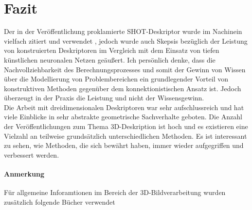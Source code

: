 \documentclass[12pt]{article}
\begin{document}
\section{Fazit}
Der in der Veröffentlichung proklamierte SHOT-Deskriptor wurde im Nachinein vielfach zitiert und verwendet \cite{c1,c2,c3}, jedoch wurde auch Skepsis bezüglich der Leistung von konstruierten Deskriptoren im Vergleich mit dem Einsatz von tiefen künstlichen neuronalen Netzen geäußert.
Ich persönlich denke, dass die Nachvollziehbarkeit des Berechnungsprozesses und somit der Gewinn von Wissen über die Modellierung von Problembereichen ein grundlegender Vorteil von konstruktiven Methoden gegenüber dem konnektionistischen Ansatz ist. Jedoch überzeugt in der Praxis die Leistung und nicht der Wissensgewinn.\\

Die Arbeit mit dreidimensionalen Deskriptoren  war sehr aufschlussreich und hat viele Einblicke in sehr abstrakte geometrische Sachverhalte geboten. Die Anzahl der Veröffentlichungen zum Thema 3D-Deskription ist hoch und es existieren eine Vielzahl an teilweise grundsätzlich unterschiedlichen Methoden. Es ist interessant zu sehen, wie Methoden, die sich bewährt haben, immer wieder aufgegriffen und verbessert werden.


\paragraph{Anmerkung}
Für allgemeine Inforamtionen im Bereich der 3D-Bildverarbeitung wurden zusätzlich folgende Bücher verwendet \cite{faugeras1993three-dimensional,hartley2004multiple,trucco1998introductory}


\end{document}
